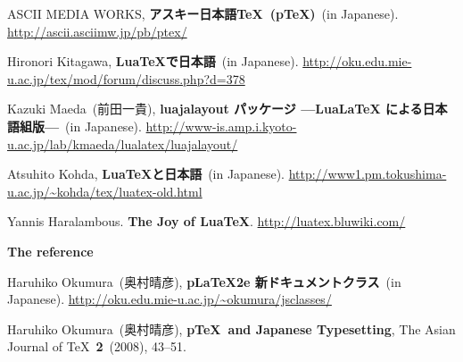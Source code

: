 \documentclass{ajt}
\begin{document}
\providecommand{\bysame}{\leavevmode\hbox to3em{\hrulefill}\thinspace}
\providecommand{\href}[2]{#2}
\begin{thebibliography}{9}


ASCII MEDIA WORKS, \textbf{アスキー日本語\TeX\ (p\TeX)}\ (in Japanese). \url{http://ascii.asciimw.jp/pb/ptex/}


Hironori Kitagawa, \textbf{LuaTeXで日本語}\ (in Japanese). \url{http://oku.edu.mie-u.ac.jp/tex/mod/forum/discuss.php?d=378}

Kazuki Maeda\ (前田一貴), \textbf{luajalayout パッケージ —LuaLaTeX による日本語組版—}\ (in Japanese).
\url{http://www-is.amp.i.kyoto-u.ac.jp/lab/kmaeda/lualatex/luajalayout/}

Atsuhito Kohda, \textbf{LuaTeXと日本語}\ (in Japanese). \url{http://www1.pm.tokushima-u.ac.jp/~kohda/tex/luatex-old.html}

Yannis Haralambous. \textbf{The Joy of LuaTeX}. \url{http://luatex.bluwiki.com/}

\textbf{The \LuaTeX reference}

Haruhiko Okumura\ (奥村晴彦), \textbf{pLaTeX2e 新ドキュメントクラス}\ (in Japanese). \url{http://oku.edu.mie-u.ac.jp/~okumura/jsclasses/}

Haruhiko Okumura\ (奥村晴彦), \textbf{p\TeX\ and Japanese Typesetting}, The Asian Journal of \TeX\ \textbf{2}~(2008), 43--51.


\end{thebibliography}
\end{document}
